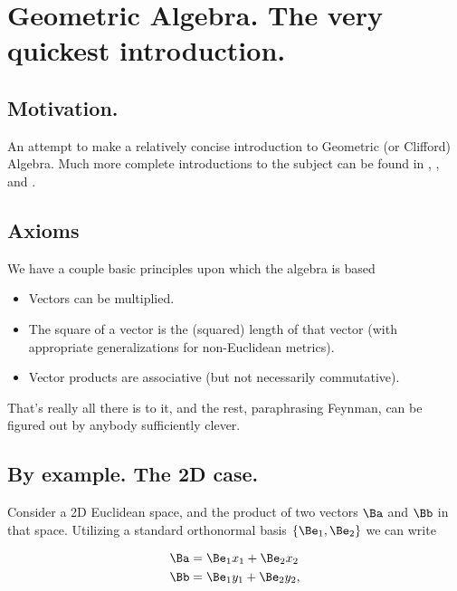 
%

\chapter{Geometric Algebra.  The very quickest introduction.}
\label{chap:gaQuickIntro}
{}
\date{Mar 16, 2012}

\beginArtWithToc

\section{Motivation.}

An attempt to make a relatively concise introduction to Geometric (or Clifford) Algebra.  Much more complete introductions to the subject can be found in \cite{dorst2007gac}, \cite{doran2003gap}, and \cite{hestenes1999nfc}.

\section{Axioms}

We have a couple basic principles upon which the algebra is based

\begin{itemize}
\item Vectors can be multiplied.
\item The square of a vector is the (squared) length of that vector (with appropriate generalizations for non-Euclidean metrics).
\item Vector products are associative (but not necessarily commutative).
\end{itemize}

That's really all there is to it, and the rest, paraphrasing Feynman, can be figured out by anybody sufficiently clever.

\section{By example.  The 2D case.}

Consider a 2D Euclidean space, and the product of two vectors $\Ba$ and $\Bb$ in that space.  Utilizing a standard orthonormal basis $\{\Be_1, \Be_2\}$ we can write

\begin{align}\label{eqn:gaQuickIntro:10}
\Ba &= \Be_1 x_1 + \Be_2 x_2 \\
\Bb &= \Be_1 y_1 + \Be_2 y_2,
\end{align}

